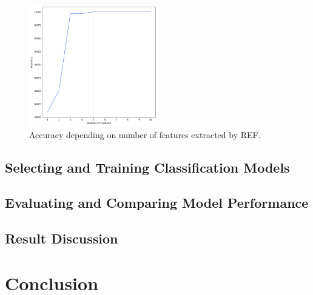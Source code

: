 \documentclass[11pt]{article}
\begin{document}
		\begin{figure}[h]
			\centering
			\includegraphics[width=0.5\textwidth]{png/ref_multi}
			\caption{Accuracy depending on number of features extracted by REF.}
			\label{fig:ref_multi}
		\end{figure}
		\subsection{Selecting and Training Classification Models}
		\subsection{Evaluating and Comparing Model Performance}
		\subsection{Result Discussion}
	\section{Conclusion}
	
\end{document}
